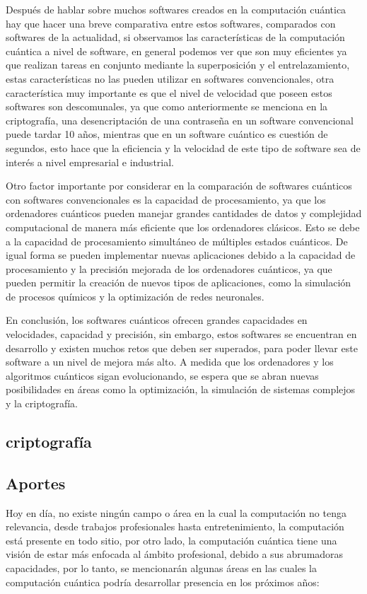 \documentclass{article}
\begin{document}
Después de hablar sobre muchos softwares creados en la computación cuántica hay que hacer una breve comparativa entre estos softwares, comparados con softwares de la actualidad, si observamos las características de la computación cuántica a nivel de software, en general podemos ver que son muy eficientes ya que realizan tareas en conjunto mediante la superposición y el entrelazamiento, estas características no las pueden utilizar en softwares convencionales, otra característica muy importante es que el nivel de velocidad que poseen estos softwares son descomunales, ya que como anteriormente se menciona en la criptografía, una desencriptación de una contraseña en un software convencional puede tardar 10 años, mientras que en un software cuántico es cuestión de segundos, esto hace que la eficiencia y la velocidad de este tipo de software sea de interés a nivel empresarial e industrial. 

Otro factor importante por considerar en la comparación de softwares cuánticos con softwares convencionales es la capacidad de procesamiento, ya que los ordenadores cuánticos pueden manejar grandes cantidades de datos y complejidad computacional de manera más eficiente que los ordenadores clásicos. Esto se debe a la capacidad de procesamiento simultáneo de múltiples estados cuánticos. De igual forma se pueden implementar nuevas aplicaciones debido a la capacidad de procesamiento y la precisión mejorada de los ordenadores cuánticos, ya que pueden permitir la creación de nuevos tipos de aplicaciones, como la simulación de procesos químicos y la optimización de redes neuronales. 

En conclusión, los softwares cuánticos ofrecen grandes capacidades en velocidades, capacidad y precisión, sin embargo, estos softwares se encuentran en desarrollo y existen muchos retos que deben ser superados, para poder llevar este software a un nivel de mejora más alto. A medida que los ordenadores y los algoritmos cuánticos sigan evolucionando, se espera que se abran nuevas posibilidades en áreas como la optimización, la simulación de sistemas complejos y la criptografía. 

\subsection{criptografía}

\subsection{Aportes}
Hoy en día, no existe ningún campo o área en la cual la computación no tenga relevancia, desde trabajos profesionales hasta entretenimiento, la computación está presente en todo sitio, por otro lado, la computación cuántica tiene una visión de estar más enfocada al ámbito profesional, debido a sus abrumadoras capacidades, por lo tanto, se mencionarán algunas áreas en las cuales la computación cuántica podría desarrollar presencia en los próximos años:
\end{document}
